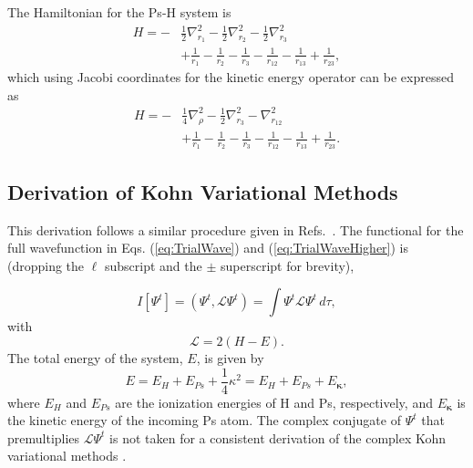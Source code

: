 \documentclass[preprint,showpacs,showkeys,preprintnumbers,amsmath,amssymb,longbibliography,pra,aps]{revtex4-1}
\begin{document}
The Hamiltonian for the Ps-H system is
\begin{align}
H = -&\frac{1}{2} \nabla_{r_1}^2 - \frac{1}{2} \nabla_{r_2}^2 - \frac{1}{2}
  \nabla_{r_3}^2  \nonumber \\
&+ \frac{1}{r_1} - \frac{1}{r_2} - \frac{1}{r_3} - \frac{1}{r_{12}} -
  \frac{1}{r_{13}}+\frac {1}{r_{23}},
\label{eq:Hamiltonian1}
\end{align}
which using Jacobi coordinates for the kinetic energy operator can be
expressed as
\begin{align}
H = -&\frac{1}{4} \nabla_{\rho}^2 - \frac{1}{2} \nabla_{r_3}^2 -
  \nabla_{r_{12}}^2  \nonumber \\
&+ \frac{1}{r_1} - \frac{1}{r_2} - \frac{1}{r_3} - \frac{1}{r_{12}} -
  \frac{1}{r_{13}}+\frac{1}{r_{23}}.
\label{eq:Hamiltonian2}
\end{align}


\subsection{Derivation of Kohn Variational Methods}
\label{sec:Kohn}
This derivation follows a similar procedure given in
Refs.~\cite{Lucchese1989,Cooper2010,Armour1991,VanReethThesis}.
The functional for the full wavefunction in Eqs. (\ref{eq:TrialWave}) and
(\ref{eq:TrialWaveHigher}) is (dropping the $\ell$ subscript and the $\pm$ 
superscript for brevity),

\begin{equation}
I[\Psi^t] = \left(\Psi^t, \mathcal{L} \Psi^t \right) = \int \Psi^t \mathcal{L}
  \Psi^t \,d\tau,
\label{eq:IlDefPsi}
\end{equation}
with
\begin{equation}
\mathcal{L} = 2(H - E).
\label{eq:LDef}
\end{equation}
The total energy of the system, $E$, is given by
\begin{equation}
\label{eq:TotalEnergy}
E = E_H + E_{Ps} + \frac{1}{4}\kappa^2 = E_H + E_{Ps} + E_{\bm \kappa},
\end{equation}
where $E_H$ and $E_{Ps}$ are the ionization energies of H and Ps, respectively,
and $E_{\bm \kappa}$ is the kinetic energy of the incoming Ps atom.
The complex conjugate of $\Psi^t$ that premultiplies $\mathcal{L} \Psi^t$
is not taken for a consistent derivation of the complex Kohn variational
methods \cite{Cooper2010}.
\end{document}
